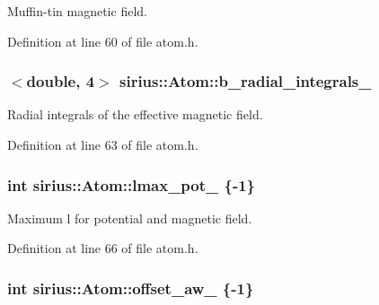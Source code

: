 Muffin-\/tin magnetic field. 



Definition at line 60 of file atom.\+h.

\hypertarget{classsirius_1_1_atom_a3d2c072bba1d9841386e465b1e892e0d}{}
\subsubsection[{b\+\_\+radial\+\_\+integrals\+\_\+}]{$<$double, 4$>$ sirius\+::\+Atom\+::b\+\_\+radial\+\_\+integrals\+\_\+\hspace{0.3cm}{\ttfamily [private]}}\label{classsirius_1_1_atom_a3d2c072bba1d9841386e465b1e892e0d}


Radial integrals of the effective magnetic field. 



Definition at line 63 of file atom.\+h.

\hypertarget{classsirius_1_1_atom_a98c17af482e25dac1a79a76360e875bf}{}
\subsubsection[{lmax\+\_\+pot\+\_\+}]{\setlength{\rightskip}{0pt plus 5cm}int sirius\+::\+Atom\+::lmax\+\_\+pot\+\_\+ \{-\/1\}\hspace{0.3cm}{\ttfamily [private]}}\label{classsirius_1_1_atom_a98c17af482e25dac1a79a76360e875bf}


Maximum l for potential and magnetic field. 



Definition at line 66 of file atom.\+h.

\hypertarget{classsirius_1_1_atom_a587631a61db11697dfcbe35c58f30d60}{}
\subsubsection[{offset\+\_\+aw\+\_\+}]{\setlength{\rightskip}{0pt plus 5cm}int sirius\+::\+Atom\+::offset\+\_\+aw\+\_\+ \{-\/1\}\hspace{0.3cm}{\ttfamily [private]}}\label{classsirius_1_1_atom_a587631a61db11697dfcbe35c58f30d60}



